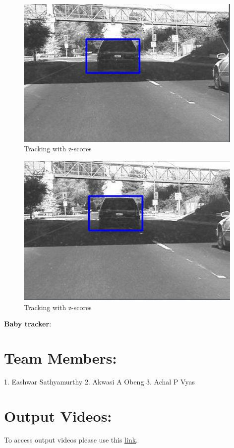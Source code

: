 \documentclass[12pt]{article}
\begin{document}
\begin{figure}[h]
    \centering
    \includegraphics[width=11cm]{trackcar4}
    \caption{Tracking with z-scores}
    \label{fig:Tracking with z-scores}
\end{figure}
\newpage
\begin{figure}[h]
    \centering
    \includegraphics[width=11cm]{trackcar5}
    \caption{Tracking with z-scores}
    \label{fig:Tracking with z-scores}
\end{figure}
\textbf{Baby tracker}:

\section{Team Members:}
1. Eashwar Sathyamurthy
2. Akwasi A Obeng
3. Achal P Vyas
\section{Output Videos:}
To access output videos please use this \href{https://drive.google.com/drive/folders/1nbAUx-p-eyOWts9neJgAPA8YATY4ekmI?usp=sharing}{\underline{link}}.
\end{document}

